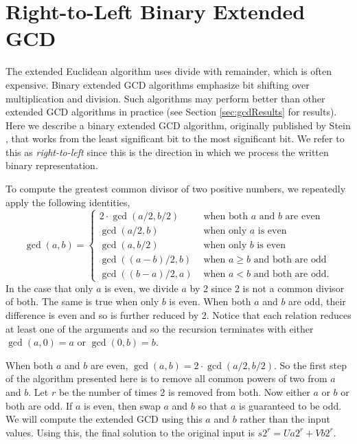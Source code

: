 \documentclass{ucalgthes1}
\theoremstyle{definition}
\begin{document}
\section{Right-to-Left Binary Extended GCD}
\label{sec:gcdR2LBin}

The extended Euclidean algorithm uses divide with remainder, which is often expensive.  Binary extended GCD algorithms emphasize bit shifting over multiplication and division.  Such algorithms may perform better than other extended GCD algorithms in practice (see Section \ref{sec:gcdResults} for results).  Here we describe a binary extended GCD algorithm, originally published by Stein \cite{Stein1967}, that works from the least significant bit to the most significant bit.  We refer to this as \emph{right-to-left} since this is the direction in which we process the written binary representation.

To compute the greatest common divisor of two positive numbers, we repeatedly apply the following identities,
\[
	\gcd(a, b) = \begin{cases}
		2 \cdot \gcd(a/2, b/2) & \textrm{ when both $a$ and $b$ are even} \\
		\gcd(a/2, b) & \textrm{ when only $a$ is even} \\
		\gcd(a, b/2) & \textrm{ when only $b$ is even} \\
		\gcd((a-b)/2, b) & \textrm{ when $a \ge b$ and both are odd} \\
		\gcd((b-a)/2, a) & \textrm{ when $a < b$ and both are odd}.
	\end{cases}
\]
In the case that only $a$ is even, we divide $a$ by 2 since 2 is not a common divisor of both.  The same is true when only $b$ is even.  When both $a$ and $b$ are odd, their difference is even and so is further reduced by 2.  Notice that each relation reduces at least one of the arguments and so the recursion terminates with either $\gcd(a, 0) = a$ or $\gcd(0, b) = b$.

When both $a$ and $b$ are even, $\gcd(a, b) = 2 \cdot \gcd(a/2, b/2)$.  So the first step of the algorithm presented here is to remove all common powers of two from $a$ and $b$.  Let $r$ be the number of times 2 is removed from both.  Now either $a$ or $b$ or both are odd.  If $a$ is even, then swap $a$ and $b$ so that $a$ is guaranteed to be odd.  We will compute the extended GCD using this $a$ and $b$ rather than the input values.  Using this, the final solution to the original input is $s2^r = Ua2^r + Vb2^r$.
\end{document}
